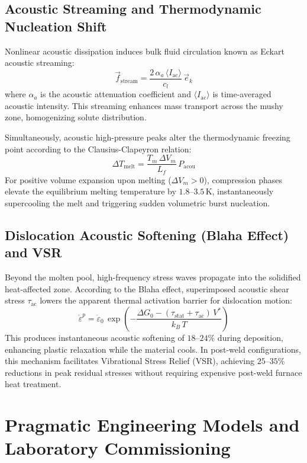 \documentclass[10pt,a4paper]{article}
\begin{document}
\subsection{Acoustic Streaming and Thermodynamic Nucleation Shift}
Nonlinear acoustic dissipation induces bulk fluid circulation known as Eckart acoustic streaming:
\[
\vec{f}_{\mathrm{stream}} = \frac{2\,\alpha_a\,\langle I_{\mathrm{ac}}\rangle}{c_l}\,\vec{e}_k
\]
where \(\alpha_a\) is the acoustic attenuation coefficient and \(\langle I_{\mathrm{ac}}\rangle\) is time-averaged acoustic intensity. This streaming enhances mass transport across the mushy zone, homogenizing solute distribution.

Simultaneously, acoustic high-pressure peaks alter the thermodynamic freezing point according to the Clausius-Clapeyron relation:
\[
\Delta T_{\mathrm{melt}} = \frac{T_m\,\Delta V_m}{L_f}\,P_{\mathrm{acou}}
\]
For positive volume expansion upon melting (\(\Delta V_m > 0\)), compression phases elevate the equilibrium melting temperature by \(1.8\text{--}3.5\,\mathrm{K}\), instantaneously supercooling the melt and triggering sudden volumetric burst nucleation.

\subsection{Dislocation Acoustic Softening (Blaha Effect) and VSR}
Beyond the molten pool, high-frequency stress waves propagate into the solidified heat-affected zone. According to the Blaha effect, superimposed acoustic shear stress \(\tau_{\mathrm{ac}}\) lowers the apparent thermal activation barrier for dislocation motion:
\[
\dot{\varepsilon}^p = \dot{\varepsilon}_0\,\exp\left(-\frac{\Delta G_0 - (\tau_{\mathrm{stat}} + \tau_{\mathrm{ac}})\,V^*}{k_B\,T}\right)
\]
This produces instantaneous acoustic softening of \(18\text{--}24\%\) during deposition, enhancing plastic relaxation while the material cools. In post-weld configurations, this mechanism facilitates Vibrational Stress Relief (VSR), achieving \(25\text{--}35\%\) reductions in peak residual stresses without requiring expensive post-weld furnace heat treatment.

\section{Pragmatic Engineering Models and Laboratory Commissioning}
\end{document}
